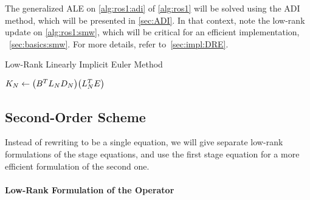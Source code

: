 \begin{remark}
  The generalized \ac{ALE} on
  \autoref{alg:ros1:adi} of \autoref{alg:ros1}
  will be solved using the \ac{ADI} method,
  which will be presented in \autoref{sec:ADI}.
  In that context, note the low-rank update on \autoref{alg:ros1:smw},
  which will be critical for an efficient implementation,
  \cf~\autoref{sec:basics:smw}.
  For more details, refer to~\autoref{sec:impl:DRE}.
\end{remark}

\begin{algorithm}[t]
  \caption{Low-Rank Linearly Implicit Euler Method}
  \label{alg:ros1}
  $K_N \gets \big( B^T L_N D_N \big) \big( L_N^T E \big)$\;
\end{algorithm}

\subsection{Second-Order Scheme}

Instead of rewriting  to be a single equation,
we will give separate low-rank formulations of the stage equations,
and use the first stage equation for a more efficient formulation of the second one.

\paragraph{Low-Rank Formulation of the \Riccati Operator}

